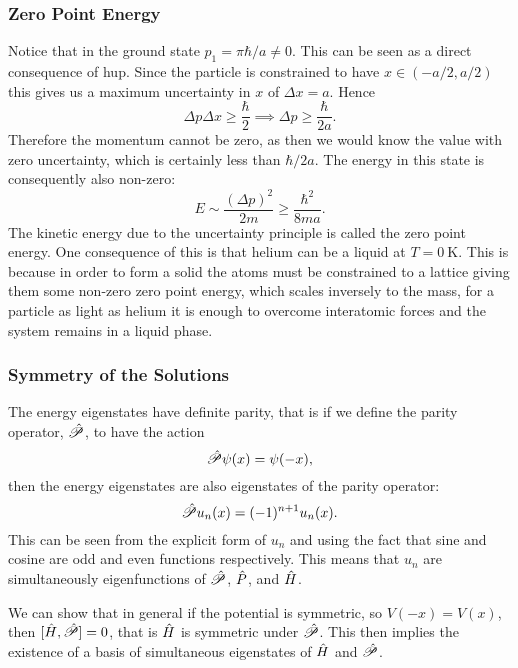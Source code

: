     \subsubsection{Zero Point Energy}
    Notice that in the ground state \(p_1 = \pi\hbar/a \ne 0\).
    This can be seen as a direct consequence of \gls{hup}.
    Since the particle is constrained to have \(x\in(-a/2, a/2)\) this gives us a maximum uncertainty in \(x\) of \(\Delta x = a\).
    Hence
    \[\Delta p\Delta x \ge \frac{\hbar}{2} \implies \Delta p \ge \frac{\hbar}{2a}.\]
    Therefore the momentum cannot be zero, as then we would know the value with zero uncertainty, which is certainly less than \(\hbar/2a\).
    The energy in this state is consequently also non-zero:
    \[E \sim \frac{(\Delta p)^2}{2m} \ge \frac{\hbar^2}{8ma}.\]
    The kinetic energy due to the uncertainty principle is called the zero point energy.
    One consequence of this is that helium can be a liquid at \(T = \SI{0}{\kelvin}\).
    This is because in order to form a solid the atoms must be constrained to a lattice giving them some non-zero zero point energy, which scales inversely to the mass, for a particle as light as helium it is enough to overcome interatomic forces and the system remains in a liquid phase.
    
    \subsubsection{Symmetry of the Solutions}
    The energy eigenstates have definite parity, that is if we define the parity operator, \(\hat{\mathscr{P}}\), to have the action
    \[\hat{\mathscr{P}}\psi(x) = \psi(-x),\]
    then the energy eigenstates are also eigenstates of the parity operator:
    \[\hat{\mathscr{P}}u_n(x) = (-1)^{n+1}u_n(x).\]
    This can be seen from the explicit form of \(u_n\) and using the fact that sine and cosine are odd and even functions respectively.
    This means that \(u_n\) are simultaneously eigenfunctions of \(\hat{\mathscr{P}}\), \(\hat{P}\), and \(\hat{H}\).
    
    We can show that in general if the potential is symmetric, so \(V(-x) = V(x)\), then \([\hat{H}, \hat{\mathscr{P}}] = 0\), that is \(\hat{H}\) is symmetric under \(\hat{\mathscr{P}}\).
    This then implies the existence of a basis of simultaneous eigenstates of \(\hat{H}\) and \(\hat{\mathscr{P}}\).
    

